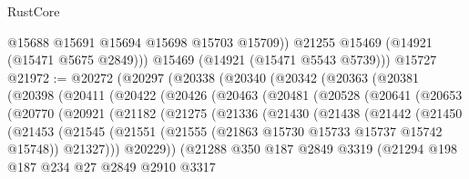 \begin{lexlean}{RustCore}
\begin{coremodule}
            @15688
            @15691
            @15694
            @15698
            @15703
            @15709))
        @21255
        @15469
        (@14921 (@15471 @5675 @2849)))
      @15469
      (@14921 (@15471 @5543 @5739)))
    @15727
@21972 := @20272
    (@20297
      (@20338
        (@20340
          (@20342
            (@20363
              (@20381
                (@20398
                  (@20411
                    (@20422
                      (@20426
                        (@20463
                          (@20481
                            (@20528
                              (@20641
                                (@20653
                                  (@20770
                                    (@20921
                                      (@21182
                                        (@21275
                                          (@21336
                                            (@21430
                                              (@21438
                                                (@21442
                                                  (@21450
                                                    (@21453
                                                      (@21545
                                                        (@21551
                                                          (@21555
                                                            (@21863
                                                              @15730
                                                              @15733
                                                              @15737
                                                              @15742
                                                              @15748))
                                                          @21327)))
                                                    @20229))
                                                (@21288
                                                  @350
                                                  @187
                                                  @2849
                                                  @3319
                                                  (@21294
                                                    @198
                                                    @187
                                                    @234
                                                    @27
                                                    @2849
                                                    @2910
                                                    @3317

\end{coremodule}
\end{lexlean}
